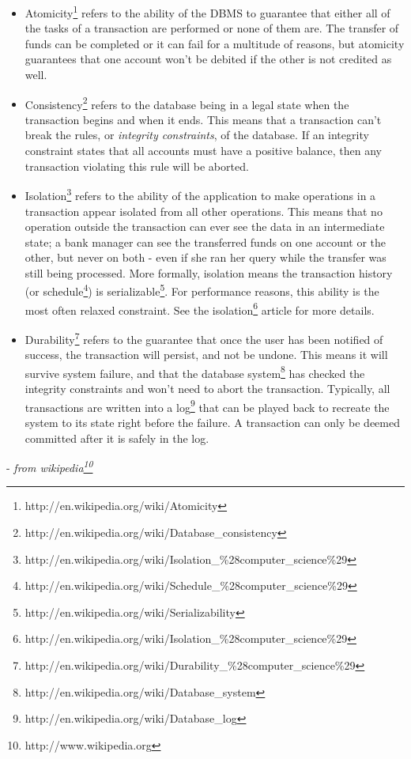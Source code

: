 \documentclass[11pt,a4paper]{report}
\begin{document}
\begin{itemize}
\item{Atomicity\footnote{http://en.wikipedia.org/wiki/Atomicity} refers to the ability of the DBMS to guarantee that either all of the tasks of a transaction are performed or none of them are. The transfer of funds can be completed or it can fail for a multitude of reasons, but atomicity guarantees that one account won't be debited if the other is not credited as well.}
\item{Consistency\footnote{http://en.wikipedia.org/wiki/Database\_consistency} refers to the database being in a legal state when the transaction begins and when it ends. This means that a transaction can't break the rules, or \textsl{integrity constraints}, of the database. If an integrity constraint states that all accounts must have a positive balance, then any transaction violating this rule will be aborted.}
\item{Isolation\footnote{http://en.wikipedia.org/wiki/Isolation\_\%28computer\_science\%29} refers to the ability of the application to make operations in a transaction appear isolated from all other operations. This means that no operation outside the transaction can ever see the data in an intermediate state; a bank manager can see the transferred funds on one account or the other, but never on both - even if she ran her query while the transfer was still being processed. More formally, isolation means the transaction history (or schedule\footnote{http://en.wikipedia.org/wiki/Schedule\_\%28computer\_science\%29}) is serializable\footnote{http://en.wikipedia.org/wiki/Serializability}. For performance reasons, this ability is the most often relaxed constraint. See the isolation\footnote{http://en.wikipedia.org/wiki/Isolation\_\%28computer\_science\%29} article for more details.}
\item{Durability\footnote{http://en.wikipedia.org/wiki/Durability\_\%28computer\_science\%29} refers to the guarantee that once the user has been notified of success, the transaction will persist, and not be undone. This means it will survive system failure, and that the database system\footnote{http://en.wikipedia.org/wiki/Database\_system} has checked the integrity constraints and won't need to abort the transaction. Typically, all transactions are written into a log\footnote{http://en.wikipedia.org/wiki/Database\_log} that can be played back to recreate the system to its state right before the failure. A transaction can only be deemed committed after it is safely in the log.}
\end{itemize}
- \textsl{from wikipedia\footnote{http://www.wikipedia.org}}
\end{document}
